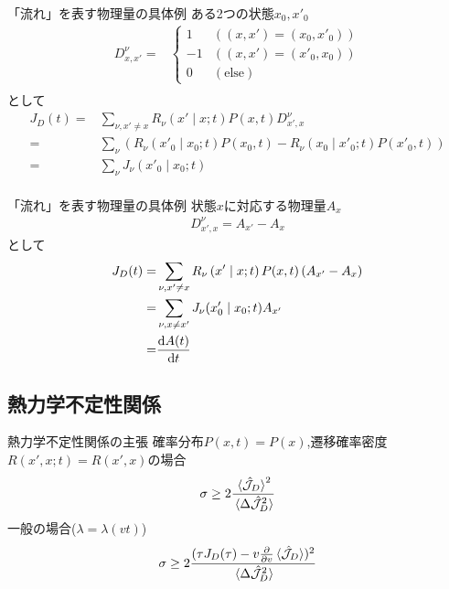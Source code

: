 \documentclass{beamer}
\begin{document}
\begin{frame}[fragile]{「流れ」を表す物理量の具体例}
    ある2つの状態$x_0,x'_0$
    \begin{align}
        D^{\nu}_{x,x'}=&
        \begin{cases}
            1 & ((x,x')=(x_0,x'_0))\\
            -1 & ((x,x')=(x'_0,x_0))\\
            0 & (\text{else})
        \end{cases}\\
    \end{align}
    として
    \begin{align}
      J_D(t)=&\sum_{\nu,x'\neq x}R_{\nu}\left(x'\mid x;t\right)P(x,t)D^{\nu}_{x',x}\\
      =&\sum_\nu\left( R_{\nu}\left(x'_0\mid x_0;t\right)P(x_0,t)-R_{\nu}\left(x_0\mid x'_0;t\right)P(x'_0,t) \right)\\
      =&\sum_\nu J_\nu(x'_0\mid x_0;t)\\
    \end{align}
\end{frame}
\begin{frame}[fragile]{「流れ」を表す物理量の具体例}
    状態$x$に対応する物理量$A_x$
    \begin{align}
        D^\nu_{x',x}=A_{x'}-A_{x}
    \end{align}
    として
    \begin{align}
      J_D(t)=&\sum_{\nu,x'\neq x}R_{\nu}\left(x'\mid x;t\right)P(x,t)\left( A_{x'}-A_x \right) \\
      =&\sum_{\nu,x\neq x'}J_\nu(x'_0\mid x_0;t)A_{x'}\\
      =&\dv{A(t)}{t}
    \end{align}
\end{frame}
\subsection{熱力学不定性関係}
\begin{frame}[fragile]{熱力学不定性関係の主張}
    確率分布$P(x,t)=P(x)$,遷移確率密度$R(x',x;t)=R(x',x)$の場合
    \begin{align}
        \sigma\ge 2\frac{\ev*{\hat{\mathcal{J}}_D}^2}{\ev*{\Delta\hat{\mathcal{J}}_D^2}}
    \end{align}
    一般の場合($\lambda=\lambda(vt)$)
    \begin{align}
        \sigma\ge 2\frac{(\tau J_D(\tau)-v\pdv{v}\ev*{\hat{\mathcal{J}}_D})^2}{\ev*{\Delta\hat{\mathcal{J}}_D^2}}
        \label{eq:thermal_uncertain_general}
      \end{align}
\end{frame}
\end{document}

